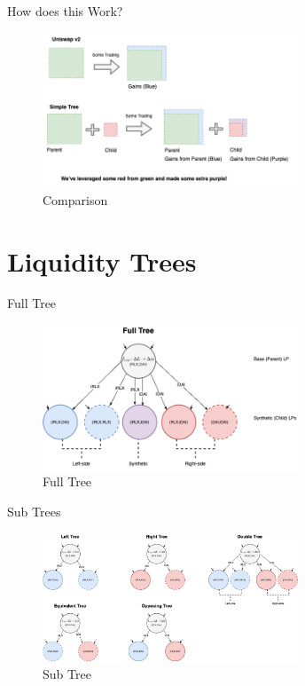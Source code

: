 \documentclass[10pt,xcolor=svgnames]{beamer} %
\begin{document}
\begin{frame}{How does this Work?} 

\begin{figure}[h!]
\includegraphics[width=3in]{img/compare.png}
\caption{Comparison} 
\label{fig:compare}
\end{figure}

\end{frame}



\section{Liquidity Trees}

\begin{frame}{Full Tree} 

\begin{figure}[h!]
\includegraphics[width=3in]{img/full_tree.png}
\caption{Full Tree} 
\label{fig:full_tree}
\end{figure}

\end{frame}

\begin{frame}{Sub Trees} 

\begin{figure}[h!]
\includegraphics[width=3in]{img/sub_trees.png}
\caption{Sub Tree} 
\label{fig:sub_trees}
\end{figure}

\end{frame}
\end{document}
